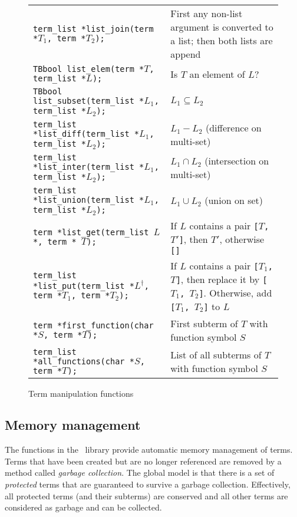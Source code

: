 \begin{figure}[tb]
\begin{center}
\begin{tabular}{|l|p{5cm}|}
{\tt term\_list *list\_join(term *$T_1$, term *$T_2$);}				& First any non-list argument is converted
										  to a list; then both lists are append\\
{\tt TBbool     list\_elem(term *$T$, term\_list *$L$);}				& Is $T$ an element of $L$?\\

{\tt TBbool     list\_subset(term\_list *$L_1$, term\_list *$L_2$);}		& $L_1 \subseteq L_2$\\
{\tt term\_list *list\_diff(term\_list *$L_1$, term\_list *$L_2$);}		& $L_1 - L_2$ (difference on multi-set)\\
{\tt term\_list *list\_inter(term\_list *$L_1$, term\_list *$L_2$);}		& $L_1 \cap L_2$ (intersection on multi-set)\\
{\tt term\_list *list\_union(term\_list *$L_1$, term\_list *$L_2$);}		& $L_1 \cup L_2$ (union on set)\\ \hline
{\tt term      *list\_get(term\_list $L$*, term * $T$);}		& If $L$ contains a pair {\tt [$T$, $T'$]}, then
									  $T'$, otherwise {\tt []}\\
{\tt term\_list *list\_put(term\_list *$L^{\dag}$, term *$T_1$, term *$T_2$);}
									& If $L$ contains a pair {\tt [$T_1$, $T$]}, then
									  replace it by  {\tt [$T_1$, $T_2$]}. Otherwise,
									  add {\tt [$T_1$, $T_2$]} to $L$\\ \hline
{\tt term  *first\_function(char *$S$, term *$T$);}		& First subterm of $T$ with function symbol $S$\\
{\tt term\_list  *all\_functions(char *$S$, term *$T$);}		& List of all subterms of $T$ with function symbol $S$\\
\hline
\end{tabular}
\caption{Term manipulation functions}
\label{fig:TermMan}
\end{center}
\end{figure}

\subsection{\label{Memory}Memory management}
The functions in the \TB\ library provide automatic memory management
of terms.  Terms that have been created but are no longer referenced
are removed by a method called {\em garbage collection}.  The global
model is that there is a set of {\em protected} terms that are
guaranteed to survive a garbage collection.  Effectively, all
protected terms (and their subterms) are conserved and all other terms
are considered as garbage and can be collected.

